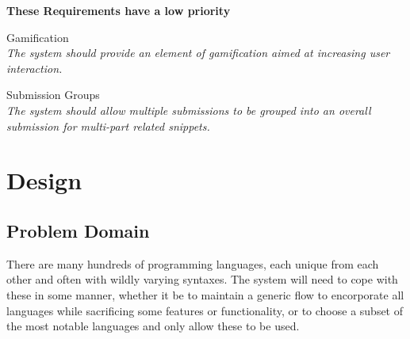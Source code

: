 \textbf{These Requirements have a low priority}

\begin{requirements}[resume]

    \item Gamification \label{gamification} \\
	\textit{The system should provide an element of gamification aimed at increasing user interaction.}

    \item Submission Groups \label{submissiongroups} \\
	\textit{The system should allow multiple submissions to be grouped into an overall submission for multi-part related snippets.}

\end{requirements}


\section{Design}

\subsection{Problem Domain}

There are many hundreds of programming languages, each unique from each other and often with wildly varying syntaxes.  
The system will need to cope with these in some manner, whether it be to maintain a generic flow to encorporate all languages while sacrificing some features or functionality, or to choose a subset of the most notable languages and only allow these to be used.




